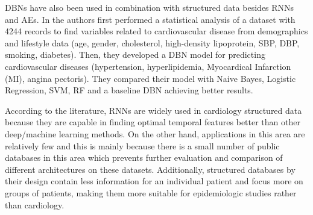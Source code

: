 \documentclass[journal]{IEEEtran}
\begin{document}
DBNs have also been used in combination with structured data besides RNNs and AEs.
In\cite{kim2017statistics} the authors first performed a statistical analysis of a dataset with 4244 records to find variables related to cardiovascular disease from demographics and lifestyle data (age, gender, cholesterol, high-density lipoprotein, SBP, DBP, smoking, diabetes).
Then, they developed a DBN model for predicting cardiovascular diseases (hypertension, hyperlipidemia, Myocardical Infarction (MI), angina pectoris).
They compared their model with Naive Bayes, Logistic Regression, SVM, RF and a baseline DBN achieving better results.

According to the literature, RNNs are widely used in cardiology structured data because they are capable in finding optimal temporal features better than other deep/machine learning methods.
On the other hand, applications in this area are relatively few and this is mainly because there is a small number of public databases in this area which prevents further evaluation and comparison of different architectures on these datasets.
Additionally, structured databases by their design contain less information for an individual patient and focus more on groups of patients, making them more suitable for epidemiologic studies rather than cardiology.
\end{document}
